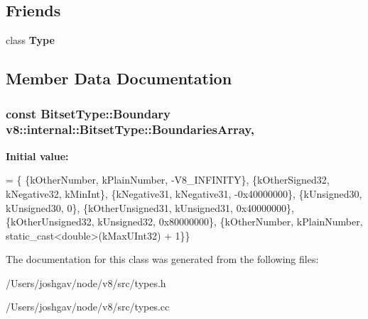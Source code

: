 \subsection*{Friends}
\begin{DoxyCompactItemize}
\item 
class {\bfseries Type}\hypertarget{classv8_1_1internal_1_1_bitset_type_a18dba29b4f3e91d6d2bc53472a6bb7cc}{}\label{classv8_1_1internal_1_1_bitset_type_a18dba29b4f3e91d6d2bc53472a6bb7cc}

\end{DoxyCompactItemize}


\subsection{Member Data Documentation}
\subsubsection[{\texorpdfstring{Boundaries\+Array}{BoundariesArray}}]{\setlength{\rightskip}{0pt plus 5cm}const {\bf Bitset\+Type\+::\+Boundary} v8\+::internal\+::\+Bitset\+Type\+::\+Boundaries\+Array\hspace{0.3cm}{\ttfamily [static]}, {\ttfamily [private]}}\hypertarget{classv8_1_1internal_1_1_bitset_type_a622ee08041bfbad955c8bbb59cabe0c6}{}\label{classv8_1_1internal_1_1_bitset_type_a622ee08041bfbad955c8bbb59cabe0c6}
{\bfseries Initial value\+:}
\begin{DoxyCode}
= \{
    \{kOtherNumber, kPlainNumber, -V8\_INFINITY\},
    \{kOtherSigned32, kNegative32, kMinInt\},
    \{kNegative31, kNegative31, -0x40000000\},
    \{kUnsigned30, kUnsigned30, 0\},
    \{kOtherUnsigned31, kUnsigned31, 0x40000000\},
    \{kOtherUnsigned32, kUnsigned32, 0x80000000\},
    \{kOtherNumber, kPlainNumber, \textcolor{keyword}{static\_cast<}\textcolor{keywordtype}{double}\textcolor{keyword}{>}(kMaxUInt32) + 1\}\}
\end{DoxyCode}


The documentation for this class was generated from the following files\+:\begin{DoxyCompactItemize}
\item 
/\+Users/joshgav/node/v8/src/types.\+h\item 
/\+Users/joshgav/node/v8/src/types.\+cc\end{DoxyCompactItemize}
